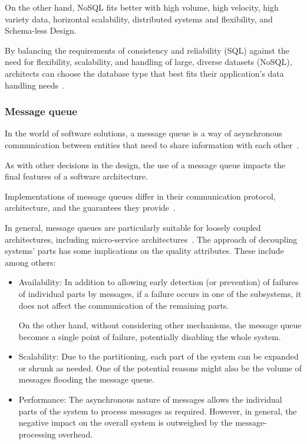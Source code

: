 \documentclass[conference]{IEEEtran}
\begin{document}
On the other hand, NoSQL fits better with high volume, high velocity, high variety data, horizontal scalability, distributed systems and flexibility, and Schema-less Design. 

By balancing the requirements of consistency and reliability (SQL) against the need for flexibility, scalability, and handling of large, diverse datasets (NoSQL), architects can choose the database type that best fits their application's data handling needs~\cite{b2}.

\subsubsection{Message queue}
In the world of software solutions, a message queue is a way of asynchronous communication between entities that need to share information with each other~\cite{Reagan2017Dec}.

As with other decisions in the design, the use of a message queue impacts the final features of a software architecture.

Implementations of message queues differ in their communication protocol, architecture, and the guarantees they provide~\cite{Fu2020Dec}.

In general, message queues are particularly suitable for loosely coupled architectures, including micro-service architectures~\cite{dossot2014rabbitmq}.
The approach of decoupling systems' parts has some implications on the quality attributes. These include among others:

\begin{itemize}
    \item Availability: In addition to allowing early detection (or prevention) of failures of individual parts by messages, if a failure occurs in one of the subsystems, it does not affect the communication of the remaining parts.
    
    On the other hand, without considering other mechanisms, the message queue becomes a single point of failure, potentially disabling the whole system.
    \item Scalability: Due to the partitioning, each part of the system can be expanded or shrunk as needed. One of the potential reasons might also be the volume of messages flooding the message queue.
    \item Performance: The asynchronous nature of messages allows the individual parts of the system to process messages as required. However, in general, the negative impact on the overall system is outweighed by the message-processing overhead.
\end{itemize}
\end{document}

